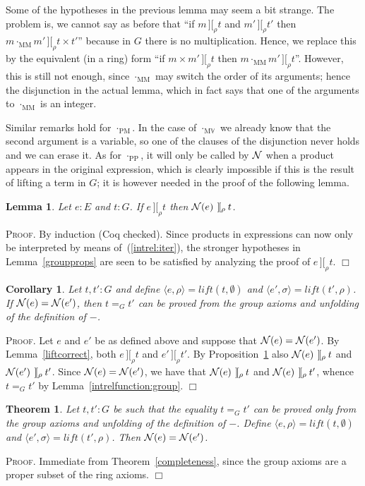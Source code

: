 \documentclass{article}
\newtheorem{theorem}[definition]{Theorem}
\newtheorem{lemma}[definition]{Lemma}
\newtheorem{corollary}[definition]{Corollary}
\newenvironment{proof}{\smallskip\textsc{Proof.}}{\hspace*{\fill}$\Box$}
\newcommand{\intII}{\,]\![}
\newcommand{\intrel}{\mathbin{\intII_{\rho}}}
\newcommand{\N}{{\cal N}}
\newcommand{\V}{{\mathbb V}}
\newcommand{\lift}{\ensuremath{\mathit{lift}}}
\newcommand{\multMV}{\ensuremath{\cdot_{\mathrm M\V}}}
\newcommand{\multMM}{\ensuremath{\cdot_{\mathrm{MM}}}}
\newcommand{\multPM}{\ensuremath{\cdot_{\mathrm{PM}}}}
\newcommand{\multPP}{\ensuremath{\cdot_{\mathrm{PP}}}}
\begin{document}
\bigskip
Some of the hypotheses in the previous lemma may seem a bit strange.  The
problem is, we cannot say as before that ``if $m\intrel t$ and $m'\intrel t'$
then $m\multMM m'\intrel t\times t'$'' because in $G$ there is no
multiplication.  Hence, we replace this by the equivalent (in a ring) form
``if $m\times m'\intrel t$ then $m\multMM m'\intrel t$''.  However, this
is still not enough, since {\multMM} may switch the order of its arguments;
hence the disjunction in the actual lemma, which in fact says that one of
the arguments to {\multMM} is an integer.

Similar remarks hold for {\multPM}.  In the case of {\multMV} we already
know that the second argument is a variable, so one of the clauses of the
disjunction never holds and we can erase it.  As for {\multPP}, it will only
be called by $\N$ when a product appears in the original expression, which
is clearly impossible if this is the result of lifting a term in $G$;
it is however needed in the proof of the following lemma.

\begin{lemma}\label{NormG} Let $e:E$ and $t:G$.  If $e\intrel t$ then
$\N(e)\intrel t$.
\end{lemma}
\begin{proof}
By induction (Coq checked).  Since products in expressions can now only be
interpreted by means of~(\ref{intrel:iter}), the stronger hypotheses
in Lemma~\ref{groupprops} are seen to be satisfied by analyzing the proof
of $e\intrel t$.
\end{proof}

\begin{corollary}\label{correctness:group}
Let $t,t':G$ and define $\langle e,\rho\rangle=\lift(t,\emptyset)$ and
$\langle e',\sigma\rangle=\lift(t',\rho)$.  If $\N(e)=\N(e')$, then
$t=_G t'$ can be proved from the group axioms and unfolding of
the definition of $-$.
\end{corollary}
\begin{proof}
Let $e$ and $e'$ be as defined above and suppose that $\N(e)=\N(e')$.
By Lemma~\ref{liftcorrect}, both $e\intrel t$ and $e'\intrel t'$.
By Proposition~\ref{NormG} also $\N(e)\intrel t$ and $\N(e')\intrel t'$.
Since $\N(e)=\N(e')$, we have that $\N(e)\intrel t$ and $\N(e)\intrel t'$,
whence $t=_G t'$ by Lemma~\ref{intrelfunction:group}.
\end{proof}

\begin{theorem}\label{completeness:group}
Let $t,t':G$ be such that the equality $t=_G t'$ can be proved
only from the group axioms and unfolding of the definition of $-$.  Define
$\langle e,\rho\rangle=\lift(t,\emptyset)$ and
$\langle e',\sigma\rangle=\lift(t',\rho)$.  Then $\N(e)=\N(e')$.
\end{theorem}
\begin{proof}
Immediate from Theorem~\ref{completeness}, since the group axioms are a
proper subset of the ring axioms.
\end{proof}
\end{document}

